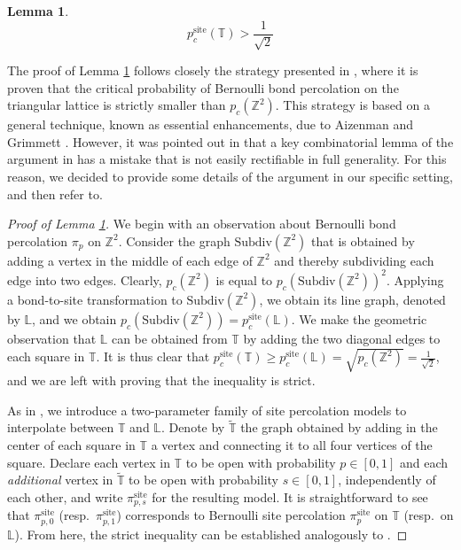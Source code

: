 \documentclass[11pt]{article}
\newcommand{\Z}{\mathbb{Z}}
\newtheorem{lemma}{Lemma}
\theoremstyle{remark}
\begin{document}
\begin{lemma}\label{SitePercolationTruncatedSquareLattice}
    \[p_c^{\mathrm{site}}(\mathbb{T}) > \frac{1}{\sqrt{2}}\]
\end{lemma}


The proof of Lemma \ref{SitePercolationTruncatedSquareLattice} follows closely the strategy presented in \cite[Theorem 3.7]{grimmett1999percolation}, where it is proven that the critical probability of Bernoulli bond percolation on the triangular lattice is strictly smaller than $p_c(\mathbb{Z}^2)$. This strategy is based on a general technique, known as essential enhancements, due to Aizenman and Grimmett \cite{aizenman1991strict}. However,  it was pointed out in  \cite{balister2014essential} that a key combinatorial lemma of the argument in \cite{aizenman1991strict} has a mistake that is not easily rectifiable in full generality. For this reason, we decided to provide some details of the argument in our specific setting, and then refer to\cite[Theorem 3.7]{grimmett1999percolation}.


\begin{proof}[Proof of Lemma \ref{SitePercolationTruncatedSquareLattice}]
   We begin with an observation about Bernoulli bond percolation $\pi_p$ on $\mathbb{Z}^2$. Consider the graph $\text{Subdiv}(\mathbb{Z}^2)$ that is obtained by adding a vertex in the middle of each edge of $\Z^2$ and thereby subdividing each edge into two edges. Clearly, $p_c(\mathbb{Z}^2)$ is equal to $p_c(\text{Subdiv}(\mathbb{Z}^2))^2$. Applying a bond-to-site transformation to $\text{Subdiv}(\mathbb{Z}^2)$, we obtain its line graph, denoted by $\mathbb{L}$, and we obtain  $p_c(\text{Subdiv}(\mathbb{Z}^2)) = p^{\mathrm{site}}_c(\mathbb{L})$. 
   We make the geometric observation that $\mathbb{L}$ can be obtained from $\mathbb{T}$ by adding the two diagonal edges to each square in $\mathbb{T}$. It is thus clear that $p^{\mathrm{site}}_c(\mathbb{T}) \ge p^{\mathrm{site}}_c(\mathbb{L}) = \sqrt{p_c(\Z^2)} = \frac{1}{\sqrt{2}}$, and we are left with proving that the inequality is strict.
   
   As in \cite[Section 3.1]{grimmett1999percolation}, we introduce a two-parameter family of site percolation models to interpolate between $\mathbb{T}$ and $\mathbb{L}$. 
   Denote by $\widetilde{\mathbb{T}}$ the graph obtained by adding in the center of each square in $\mathbb{T}$ a vertex and connecting it to all four vertices of the square. Declare each vertex in $\mathbb{T}$ to be open with probability $p \in [0,1]$ and each \emph{additional} vertex in $\widetilde{\mathbb{T}}$ to be open with probability $s\in[0,1]$, independently of each other, and write $\pi^{\mathrm{site}}_{p,s}$ for the  resulting model. It is straightforward to see that $\pi^{\mathrm{site}}_{p,0}$ (resp.\ $\pi^{\mathrm{site}}_{p,1}$) corresponds to Bernoulli site percolation $\pi^{\mathrm{site}}_p$ on $\mathbb{T}$ (resp.\ on $\mathbb{L}$). From here, the strict inequality can be established analogously to \cite[Theorem 3.7]{grimmett1999percolation}.
    \end{proof}
    
\end{document}
